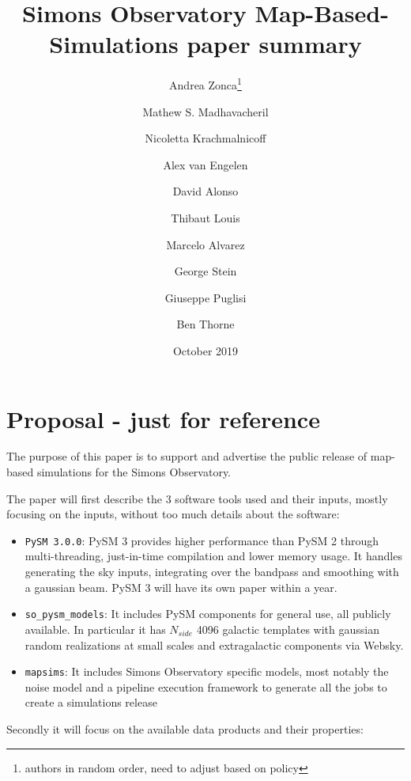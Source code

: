 \documentclass{article}
\title{Simons Observatory Map-Based-Simulations paper summary}
\author{Andrea Zonca\footnote{authors in random order, need to adjust based on policy} \and Mathew S. Madhavacheril \and Nicoletta Krachmalnicoff \and Alex van Engelen \and David Alonso \and Thibaut Louis \and Marcelo Alvarez \and George Stein \and Giuseppe Puglisi \and Ben Thorne}
\date{October 2019}
\begin{document}
\maketitle

\section{Proposal - just for reference}

The purpose of this paper is to support and advertise the public release of
map-based simulations for the Simons Observatory.

The paper will first describe the 3 software tools used and their inputs, mostly focusing on the inputs, without too much details about the software:
\begin{itemize}
    \item \texttt{PySM 3.0.0}: PySM 3 provides higher performance than PySM 2 through multi-threading, just-in-time compilation and lower memory usage. It handles generating the sky inputs, integrating over the bandpass and smoothing with a gaussian beam. PySM 3 will have its own paper within a year.
    \item \texttt{so\_pysm\_models}: It includes PySM components for general use, all publicly available. In particular it has $N_{side}$ 4096 galactic templates with gaussian random realizations at small scales and extragalactic components via Websky.
    \item \texttt{mapsims}: It includes Simons Observatory specific models, most notably the noise model and a pipeline execution framework to generate all the jobs to create a simulations release
\end{itemize}

Secondly it will focus on the available data products and their properties:
\end{document}
